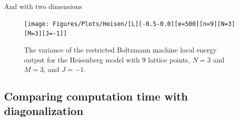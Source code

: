 And with two dimensions

\begin{figure}[H]
  \begin{center}
    \texttt{[image: Figures/Plots/Heisen/[L][-0.5-0.0][e=500][n=9][N=3][M=3][J=-1]]}
  \end{center}
  \caption{The variance of the restricted Boltzmann machine local energy output for the Heisenberg model with $9$ lattice points, $N=3$ and $M=3$, and $J=-1$.}
\end{figure}

\subsection{Comparing computation time with diagonalization}
